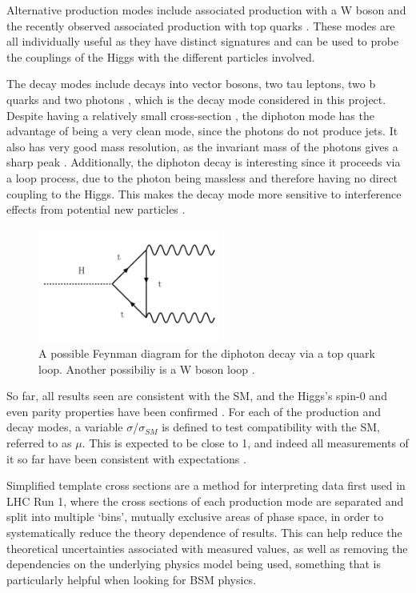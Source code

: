 \documentclass[12pt]{article}
\begin{document}
Alternative production modes include associated production with a W boson and the recently observed associated production with top quarks \cite{tth}. These modes are all individually useful as they have distinct signatures and can be used to probe the couplings of the Higgs with the different particles involved. 

The decay modes include decays into vector bosons, two tau leptons, two b quarks and two photons \cite{gluinotheory1}, which is the decay mode considered in this project. Despite having a relatively small cross-section \cite{cmsannouncement}, the diphoton mode has the advantage of being a very clean mode, since the photons do not produce jets. It also has very good mass resolution, as the invariant mass of the photons gives a sharp peak \cite{seezdiphoton}. Additionally, the diphoton decay is interesting since it proceeds via a loop process, due to the photon being massless and therefore having no direct coupling to the Higgs. This makes the decay mode more sensitive to interference effects from potential new particles \cite{cmsanalysis1}. 

\begin{figure}[H]
\centering
\includegraphics[width=6cm]{decay.png}
\caption{A possible Feynman diagram for the diphoton decay via a top quark loop. Another possibiliy is a W boson loop \cite{feynmanmaker}.}
	\label{decay}
\end{figure}

So far, all results seen are consistent with the SM, and the Higgs's spin-0 and even parity properties have been confirmed \cite{cmsupdate2} \cite{parity2}. For each of the production and decay modes, a variable $\sigma$/$\sigma_{SM}$ is defined to test compatibility with the SM, referred to as $\mu$. This is expected to be close to 1, and indeed all measurements of it so far have been consistent with expectations \cite{atlasann}\cite{cmsupdate2}.

Simplified template cross sections are a method for interpreting data first used in LHC Run 1, where the cross sections of each production mode are separated and split into multiple `bins', mutually exclusive areas of phase space, in order to systematically reduce the theory dependence of results. This can help reduce the theoretical uncertainties associated with measured values, as well as removing the dependencies on the underlying physics model being used, something that is particularly helpful when looking for BSM physics. 
\end{document}
